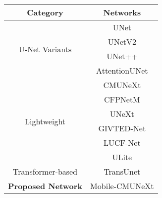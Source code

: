 \centering
\begin{tabular}{|c|c|}
    \hline
    \textbf{Category} & \textbf{Networks} \\ \hline
    \multirow{4}{*}{U-Net Variants} & UNet \\
                                & UNetV2 \\
                                & UNet++ \\
                                & AttentionUNet \\ \hline
    \multirow{6}{*}{Lightweight} & CMUNeXt \\
                                 & CFPNetM \\
                                 & UNeXt \\
                                 & GIVTED-Net \\
                                 & LUCF-Net \\
                                 & ULite \\ \hline
    Transformer-based & TransUnet \\ \hline
    \textbf{Proposed Network} & Mobile-CMUNeXt \\ \hline
\end{tabular}